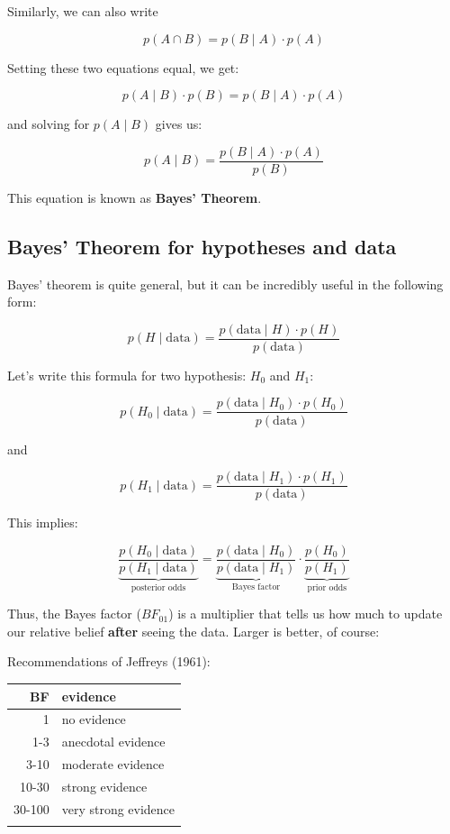 \documentclass[11pt]{article}
\begin{document}
Similarly, we can also write

\[
p(A\cap B) = p(B\mid A)\cdot p(A)
\]

Setting these two equations equal, we get:

\[
p(A\mid B)\cdot p(B) = p(B\mid A)\cdot p(A)
\]

and solving for $p(A\mid B)$ gives us:

\[
p(A\mid B) = \frac{p(B\mid A)\cdot p(A)}{p(B)}
\]

This equation is known as \textbf{Bayes' Theorem}.

\subsection*{Bayes' Theorem for hypotheses and data}
\label{sec-2-2}

Bayes' theorem is quite general, but it can be incredibly useful in the following form:

\[
p(H\mid \text{data}) = \frac{p(\text{data}\mid H)\cdot p(H)}{p(\text{data})}
\]

Let's write this formula for two hypothesis: $H_0$ and $H_1$:

\[
p(H_0\mid \text{data}) = \frac{p(\text{data}\mid H_0)\cdot p(H_0)}{p(\text{data})}
\]

and

\[
p(H_1\mid \text{data}) = \frac{p(\text{data}\mid H_1)\cdot p(H_1)}{p(\text{data})}
\]

This implies:

\[
\underbrace{\frac{p(H_0 \mid \text{data})}{p(H_1\mid\text{data})}}_{\text{posterior odds}} = \underbrace{\frac{p(\text{data}\mid H_0)}{p(\text{data}\mid H_1)}}_{\text{Bayes factor}} \cdot \underbrace{\frac{p(H_0)}{p(H_1)}}_{\text{prior odds}}
\]

Thus, the Bayes factor ($BF_{01}$) is a multiplier that tells us how much to update our relative belief \textbf{after} seeing the data.  Larger is better, of course:

Recommendations of Jeffreys (1961):

\begin{center}
\begin{tabular}{rl}
BF & evidence\\
\hline
1 & no evidence\\
1-3 & anecdotal evidence\\
3-10 & moderate evidence\\
10-30 & strong evidence\\
30-100 & very strong evidence\\
 & \\
\end{tabular}
\end{center}
\end{document}
